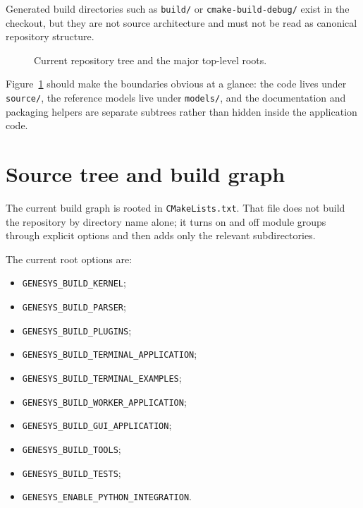 Generated build directories such as \texttt{build/} or
\texttt{cmake-build-debug/} exist in the checkout, but they are not source
architecture and must not be read as canonical repository structure.

\begin{figure}[htbp]
\centering
\caption{Current repository tree and the major top-level roots.}
\label{fig:repo-tree}
\end{figure}

Figure~\ref{fig:repo-tree} should make the boundaries obvious at a glance: the
code lives under \texttt{source/}, the reference models live under
\texttt{models/}, and the documentation and packaging helpers are separate
subtrees rather than hidden inside the application code.

\section{Source tree and build graph}
\label{sec:repo-source-tree}

The current build graph is rooted in \texttt{CMakeLists.txt}. That file does not
build the repository by directory name alone; it turns on and off module groups
through explicit options and then adds only the relevant subdirectories.

The current root options are:
\begin{itemize}
\item \texttt{GENESYS\_BUILD\_KERNEL};
\item \texttt{GENESYS\_BUILD\_PARSER};
\item \texttt{GENESYS\_BUILD\_PLUGINS};
\item \texttt{GENESYS\_BUILD\_TERMINAL\_APPLICATION};
\item \texttt{GENESYS\_BUILD\_TERMINAL\_EXAMPLES};
\item \texttt{GENESYS\_BUILD\_WORKER\_APPLICATION};
\item \texttt{GENESYS\_BUILD\_GUI\_APPLICATION};
\item \texttt{GENESYS\_BUILD\_TOOLS};
\item \texttt{GENESYS\_BUILD\_TESTS};
\item \texttt{GENESYS\_ENABLE\_PYTHON\_INTEGRATION}.
\end{itemize}

